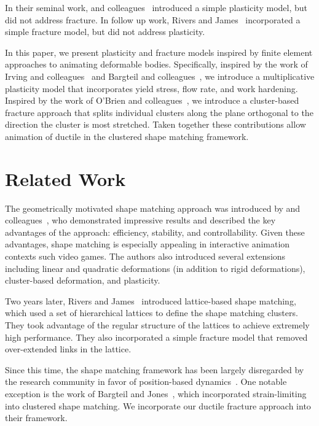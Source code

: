 \documentclass[review]{acmsiggraph}
\begin{document}
In their seminal work, \Mueller and colleagues~ introduced a simple plasticity
model, but did not address fracture.  In follow up work, Rivers and James~
incorporated a simple fracture model, but did not address plasticity.  

In this paper, we present plasticity and fracture models inspired by finite element approaches to 
animating deformable bodies.  
Specifically, inspired by the work of Irving and colleagues~ and Bargteil and 
colleagues~, we introduce a multiplicative plasticity model that incorporates
yield stress, flow rate, and work hardening.  Inspired by the work of O'Brien and colleagues~,
we introduce a cluster-based fracture approach that splits individual clusters along the plane orthogonal to the direction the 
cluster is most stretched.
Taken together these contributions allow animation of ductile in the clustered shape matching framework.

\section{Related Work}
The geometrically motivated shape matching approach was introduced by \Mueller and 
colleagues~, who demonstrated impressive results and 
described the key advantages of the approach: efficiency, stability, and controllability.
Given these advantages, shape matching is especially appealing in interactive animation contexts such 
video games.  The authors also introduced several extensions including linear and quadratic deformations 
(in addition to rigid deformations), cluster-based deformation, and plasticity.  

Two years later, Rivers and James~ introduced lattice-based shape matching,
which used a set of hierarchical lattices to define the shape matching clusters.  They took advantage
of the regular structure of the lattices to achieve extremely high performance.  They also incorporated a 
simple fracture model that removed over-extended links in the lattice.  

Since this time, the shape matching framework has been largely disregarded by the research community in favor of position-based
dynamics~\cite{Mueller:2007:PBD,Bender:2013:PBM,Bender:2014:ASO,Macklin:2014:UPP}.  One notable exception is
the work of Bargteil and Jones~, which incorporated strain-limiting into clustered shape matching.
We incorporate our ductile fracture approach into their framework.
\end{document}
